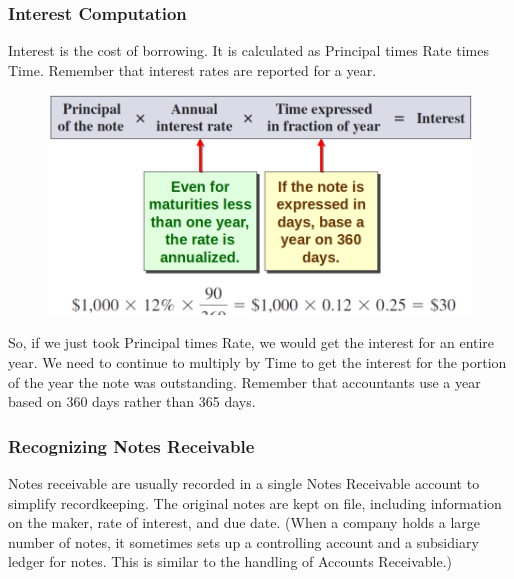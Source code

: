 \documentclass[../main.tex]{subfiles}
\begin{document}
	\subsubsection{Interest Computation}
	
	Interest is the cost of borrowing.  It is calculated as Principal times 
	Rate times Time. Remember that interest rates are reported for a year. 
	
	\begin{figure}[ht]
		\centering
		\includegraphics[width=0.8\columnwidth]{images/c6/interest_computation.png}
	\end{figure}
	So, if we just took Principal times Rate, we would get the interest for an 
	entire year. We need to continue to multiply by Time to get the interest 
	for the portion of the year the note was outstanding. Remember that 
	accountants use a year based on 360 days rather than 365 days.
	
	\subsubsection{Recognizing Notes Receivable}
	
	Notes receivable are usually recorded in a single Notes Receivable account 
	to simplify recordkeeping. The original notes are kept on file, including 
	information on the maker, rate of interest, and due date. (When a company 
	holds a large number of notes, it sometimes sets up a controlling account 
	and a subsidiary ledger for notes. This is similar to the handling of 
	Accounts Receivable.) 
	
\end{document}
